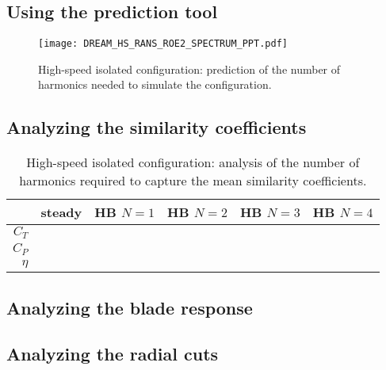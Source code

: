 
\subsection{Using the prediction tool}
\label{sub:dream_hs_conv_hb_prediction_tool}

\begin{figure}[htp]
  \centering
  \texttt{[image: DREAM\_HS\_RANS\_ROE2\_SPECTRUM\_PPT.pdf]}
  \caption{High-speed isolated configuration: prediction of the number
  of harmonics needed to simulate the configuration.}
  \label{fig:DREAM_HS_RANS_ROE2_SPECTRUM_PPT}
\end{figure}

\subsection{Analyzing the similarity coefficients}
\label{sub:dream_hs_conv_hb_sim_coeff}
\begin{table}[htp]
   \centering
  \begin{tabular}{rccccc}
    \toprule
    & steady & HB $N=1$ & HB $N=2$ & HB $N=3$ & HB $N=4$ \\
    \midrule
    $C_T$  & \\
    $C_P$  & \\
    $\eta$ & \\
    \bottomrule
  \end{tabular}
  \caption{High-speed isolated configuration: analysis of the number of harmonics
  required to capture the mean similarity coefficients.}
  \label{tab:dream_hs_hb_conv_sim}
\end{table}

\subsection{Analyzing the blade response}
\label{sub:dream_hs_conv_hb_blade_response}

\subsection{Analyzing the radial cuts}
\label{sub:dream_hs_conv_hb_slice_r}
